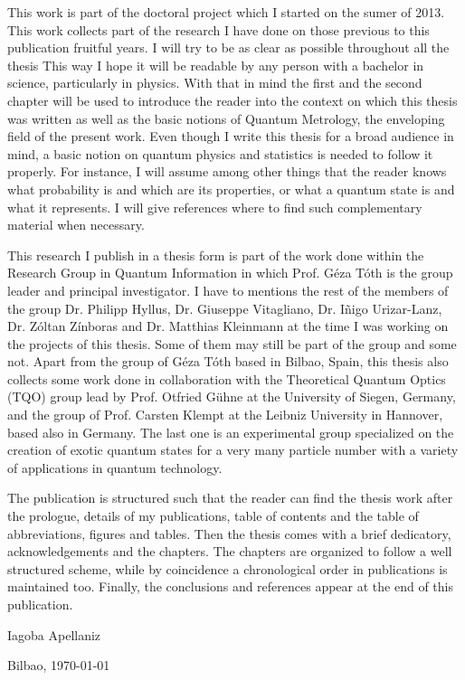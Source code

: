 This work is part of the doctoral project which I started on the sumer of 2013.
This work collects part of the research I have done on those previous to this publication fruitful years.
I will try to be as clear as possible throughout all the thesis
This way I hope it will be readable by any person with a bachelor in science, particularly in physics.
With that in mind the first and the second chapter will be used to introduce the reader into the context on which this thesis was written as well as the basic notions of Quantum Metrology, the enveloping field of the present work.
Even though I write this thesis for a broad audience in mind, a basic notion on quantum physics and statistics is needed to follow it properly.
For instance, I will assume among other things that the reader knows what probability is and which are its properties, or what a quantum state is and what it represents.
I will give references where to find such complementary material when necessary.

This research I publish in a thesis form is part of the work done within the Research Group in Quantum Information in which Prof. G\'eza T\'oth is the group leader and principal investigator.
I have to mentions the rest of the members of the group Dr. Philipp Hyllus, Dr. Giuseppe Vitagliano, Dr. I\~nigo Urizar-Lanz, Dr. Z\'oltan Z\'inboras and Dr. Matthias Kleinmann at the time I was working on the projects of this thesis. Some of them may still be part of the group and some not.
Apart from the group of G\'eza T\'oth based in Bilbao, Spain, this thesis also collects some work done in collaboration with the Theoretical Quantum Optics (TQO) group lead by Prof. Otfried G\"uhne at the University of Siegen, Germany, and the group of Prof. Carsten Klempt at the Leibniz University in Hannover, based also in Germany. The last one is an experimental group specialized on the creation of exotic quantum states for a very many particle number with a variety of applications in quantum technology.

The publication is structured such that the reader can find the thesis work after the prologue, details of my publications, table of contents and the table of abbreviations, figures and tables.
Then the thesis comes with a brief dedicatory, acknowledgements and the chapters.
The chapters are organized to follow a well structured scheme, while by coincidence a chronological order in publications is maintained too.
Finally, the conclusions and references appear at the end of this publication.

\begin{flushright}
  Iagoba Apellaniz

  Bilbao, \today
\end{flushright}
